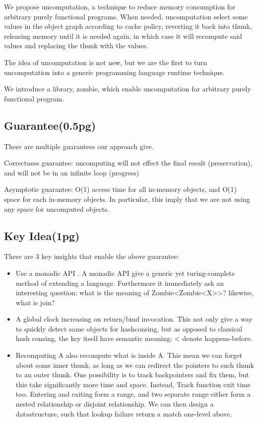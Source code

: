 We propose uncomputation, a technique to reduce memory consumption for arbitrary purely functional programs. When needed, uncomputation select some values in the object graph according to cache policy, reverting it back into thunk, releasing memory until it is needed again, in which case it will recompute said values and replacing the thunk with the values.

The idea of uncomputation is not new, but we are the first to turn uncomputation into a generic programming language runtime technique. 

We introduce a library, zombie, which enable uncomputation for arbitrary purely functional program.
\subsection{Guarantee(0.5pg)}
There are multiple guarantees our approach give.

Correctness guarantee: uncomputing will not effect the final result (preservation), and will not be in an infinite loop (progress)

Asymptotic guarantee: O(1) access time for all in-memory objects, and O(1) space for each in-memory objects. In particular, this imply that we are not using any space for uncomputed objects.

\subsection{Key Idea(1pg)}
There are 3 key insights that enable the above guarantee:
\begin{itemize}
	\item Use a monadic API . A monadic API give a generic yet turing-complete  method of extending a language. Furthermore it immediately ask an interesting question: what is the meaning of Zombie<Zombie<X>>? likewise, what is join?
	\item A global clock increasing on return/bind invocation. This not only give a way to quickly detect same objects for hashconsing, but as opposed to classical hash consing, the key itself have semantic meaning: < denote happens-before.
	\item Recomputing A also recompute what is inside A. This mean we can forget about some inner thunk, as long as we can redirect the pointers to such thunk to an outer thunk. One possibility is to track backpointers and fix them, but this take significantly more time and space. Instead, Track function exit time too. Entering and exiting form a range, and two separate range either form a nested relationship or disjoint relationship. We can then design a datastructure, such that lookup failure return a match one-level above.
\end{itemize}

